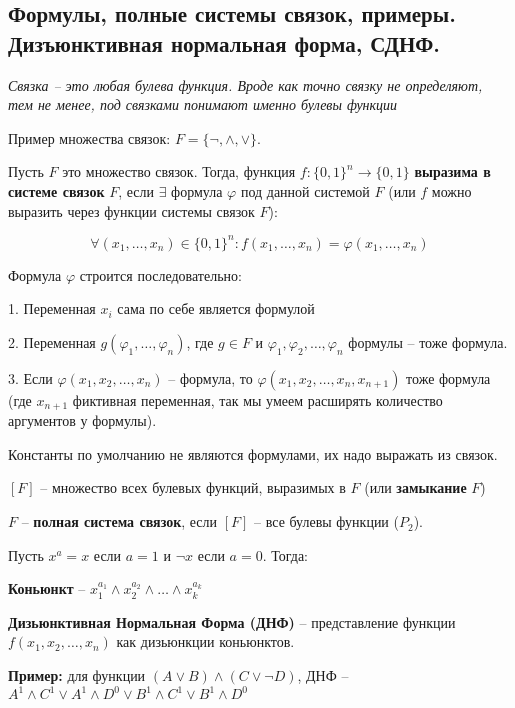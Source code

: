 \subsection{Формулы, полные системы связок, примеры. Дизъюнктивная нормальная форма, СДНФ.}

\textit{Связка -- это любая булева функция. Вроде как точно связку не определяют, тем не менее, под связками понимают именно булевы функции}

Пример множества связок: $F = \{\neg, \wedge, \vee\}$.

Пусть $F$ это множество связок. Тогда, функция $f: \{0, 1\}^n \rightarrow \{0, 1\}$ \textbf{выразима в системе связок} $F$, если $\exists$ формула $\varphi$ под данной системой $F$ (или $f$ можно выразить через функции системы связок $F$):

$$\forall (x_1, \ldots, x_n) \in \{0, 1\}^n: f(x_1, \ldots, x_n) = \varphi(x_1, \ldots, x_n)$$

Формула $\varphi$ строится последовательно:

\hspace{0.5cm}\parbox{11cm}{
       1. Переменная $x_i$ сама по себе является формулой

       2. Переменная $g(\varphi_1, \ldots, \varphi_n)$, где $g \in F$ и $\varphi_1, \varphi_2, \ldots, \varphi_n$ формулы -- тоже формула.

       3. Если $\varphi(x_1, x_2, \ldots, x_n)$ -- формула, то $\varphi(x_1, x_2, \ldots, x_n, x_{n + 1})$ тоже формула (где $x_{n + 1}$ фиктивная переменная, так мы умеем расширять количество аргументов у формулы).
}

Константы по умолчанию не являются формулами, их надо выражать из связок.

$[F]$ -- множество всех булевых функций, выразимых в $F$ (или \textbf{замыкание} $F$)

$F$ -- \textbf{полная система связок}, если $[F]$ -- все булевы функции ($P_2$).

Пусть $x^a = x$ если $a = 1$ и $\neg x$ если $a = 0$. Тогда:

\textbf{Коньюнкт} -- $x_1^{a_1} \wedge x_2^{a_2} \wedge \ldots \wedge x_k^{a_k}$

\textbf{Дизьюнктивная Нормальная Форма (ДНФ)} -- представление функции $f(x_1, x_2, \ldots, x_n)$ как дизьюнкции коньюнктов.

\textbf{Пример:} для функции $(A \vee B) \wedge (C \vee \neg D)$, ДНФ -- $A^1 \wedge C^1 \vee A^1 \wedge D^{0} \vee B^1 \wedge C^1 \vee B^1 \wedge D^{0}$
